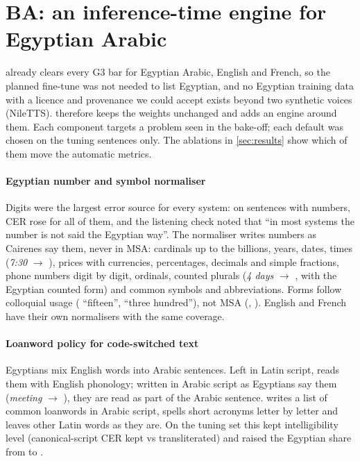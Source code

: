 \section{BA: an inference-time engine for Egyptian Arabic}\label{sec:engine}

\vox already clears every G3 bar for Egyptian Arabic, English and French, so the planned fine-tune was not needed to
list Egyptian, and no Egyptian training data with a licence and provenance we could accept exists beyond two
synthetic voices (NileTTS). \BA therefore keeps the \vox weights unchanged and adds an engine around them. Each
component targets a problem seen in the bake-off; each default was chosen on the tuning sentences only. The
ablations in \cref{sec:results} show which of them move the automatic metrics.

\paragraph{Egyptian number and symbol normaliser}
Digits were the largest error source for every system: on sentences with numbers, CER rose for all of them, and
the listening check noted that ``in most systems the number is not said the Egyptian way''. The normaliser writes
numbers as Cairenes say them, never in MSA: cardinals up to the billions, years, dates, times (\emph{7:30}
$\rightarrow$ ), prices with currencies, percentages, decimals and simple fractions, phone numbers
digit by digit, ordinals, counted plurals (\emph{4 days} $\rightarrow$ , with the Egyptian
counted form) and common symbols and abbreviations. Forms follow colloquial usage ( ``fifteen'',
 ``three hundred''), not MSA (, ). English and French have
their own normalisers with the same coverage.

\paragraph{Loanword policy for code-switched text}
Egyptians mix English words into Arabic sentences. Left in Latin script, \vox reads them with English phonology;
written in Arabic script as Egyptians say them (\emph{meeting} $\rightarrow$ ), they are read as part of
the Arabic sentence. \BA writes a list of common loanwords in Arabic script, spells short acronyms letter by letter
and leaves other Latin words as they are. On the tuning set this kept intelligibility level (canonical-script CER
 kept vs  transliterated) and raised the Egyptian share from  to
.

